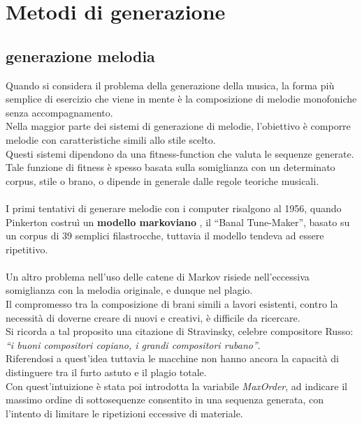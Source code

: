 \documentclass[a4paper,12pt]{report}
\begin{document}
\chapter{Metodi di generazione}

\section{generazione melodia}

Quando si considera il problema della generazione della musica, la forma più semplice di esercizio che viene in mente è la composizione di melodie monofoniche senza accompagnamento.\\
Nella maggior parte dei sistemi di generazione di melodie, l'obiettivo è comporre melodie con caratteristiche simili allo stile scelto.\\
Questi sistemi dipendono da una fitness-function che valuta le sequenze generate.\\
Tale funzione di fitness è spesso basata sulla somiglianza con un determinato corpus, stile o brano, o dipende in generale dalle regole teoriche musicali.\\
\\
I primi tentativi di generare melodie con i computer risalgono al 1956, quando Pinkerton costruì un \textbf{modello markoviano} , il “Banal Tune-Maker”, basato su un corpus di 39 semplici filastrocche,
tuttavia il modello tendeva ad essere ripetitivo.\\
\\
Un altro problema nell'uso delle catene di Markov risiede nell'eccessiva somiglianza con la melodia originale, e dunque nel plagio. \\
Il compromesso tra la composizione di brani simili a lavori esistenti, contro la necessità di doverne creare di nuovi e creativi, è difficile da ricercare. \\
Si ricorda a tal proposito una citazione di Stravinsky, celebre compositore Russo: \\
\textit{“i buoni compositori copiano, i grandi compositori rubano”}.\\
Riferendosi a quest'idea tuttavia le macchine non hanno ancora la capacità di distinguere tra il furto astuto e il plagio totale. \\
Con quest'intuizione è stata poi introdotta la variabile \textit{MaxOrder}, ad indicare il massimo ordine di sottosequenze consentito in una sequenza generata, con l'intento di limitare le ripetizioni eccessive di materiale. \\
\end{document}
